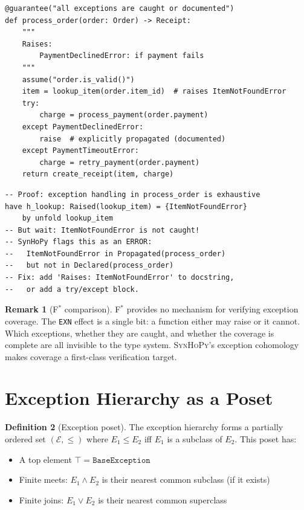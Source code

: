 \documentclass[11pt,a4paper]{report}
\theoremstyle{definition}
\newtheorem{definition}{Definition}[chapter]
\newtheorem{remark}[definition]{Remark}
\theoremstyle{plain}
\newcommand{\fstar}{F$^{*}$}
\newcommand{\synhopy}{\textsc{SynHoPy}}
\begin{document}
\begin{lstlisting}[style=synhopy]
@guarantee("all exceptions are caught or documented")
def process_order(order: Order) -> Receipt:
    """
    Raises:
        PaymentDeclinedError: if payment fails
    """
    assume("order.is_valid()")
    item = lookup_item(order.item_id)  # raises ItemNotFoundError
    try:
        charge = process_payment(order.payment)
    except PaymentDeclinedError:
        raise  # explicitly propagated (documented)
    except PaymentTimeoutError:
        charge = retry_payment(order.payment)
    return create_receipt(item, charge)
\end{lstlisting}

\begin{lstlisting}[style=proof]
-- Proof: exception handling in process_order is exhaustive
have h_lookup: Raised(lookup_item) = {ItemNotFoundError}
    by unfold lookup_item
-- But wait: ItemNotFoundError is not caught!
-- SynHoPy flags this as an ERROR:
--   ItemNotFoundError in Propagated(process_order)
--   but not in Declared(process_order)
-- Fix: add 'Raises: ItemNotFoundError' to docstring,
--   or add a try/except block.
\end{lstlisting}

\begin{remark}[\fstar{} comparison]
\fstar{} provides no mechanism for verifying exception coverage.
The \lstinline[style=fstar]|EXN| effect is a single bit: a function either may
raise or it cannot.  Which exceptions, whether they are caught, and whether
the coverage is complete are all invisible to the type system.
\synhopy{}'s exception cohomology makes coverage a first-class verification
target.
\end{remark}

\section{Exception Hierarchy as a Poset}

\begin{definition}[Exception poset]
The exception hierarchy forms a partially ordered set $(\mathcal{E}, \leq)$
where $E_1 \leq E_2$ iff $E_1$ is a subclass of $E_2$.  This poset has:
\begin{itemize}
  \item A top element $\top = \texttt{BaseException}$
  \item Finite meets: $E_1 \wedge E_2$ is their nearest common subclass (if it exists)
  \item Finite joins: $E_1 \vee E_2$ is their nearest common superclass
\end{itemize}
\end{definition}
\end{document}
